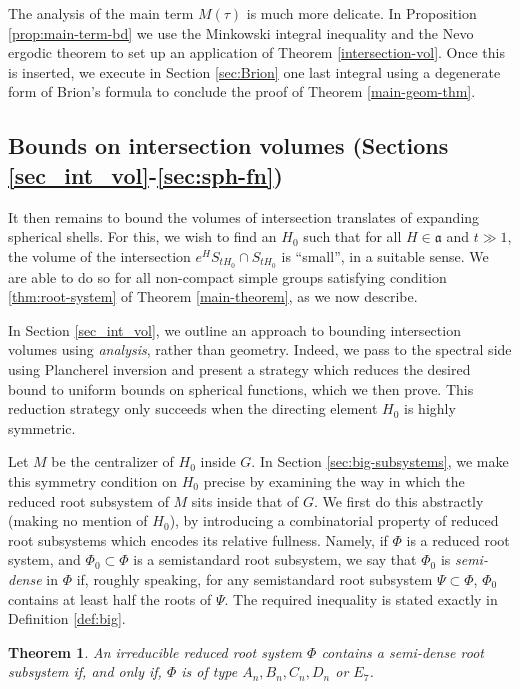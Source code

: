 \documentclass[12pt]{amsart}
\newtheorem{theorem}{Theorem}[section]
\theoremstyle{remark}
\begin{document}
The analysis of the main term $M(\tau)$ is much more delicate. In Proposition \ref{prop:main-term-bd} we use the Minkowski integral inequality and the Nevo ergodic theorem to set up an application of Theorem \ref{intersection-vol}. Once this is inserted, we execute in Section \ref{sec:Brion} one last integral using a degenerate form of Brion's formula to conclude the proof of Theorem \ref{main-geom-thm}.


\subsection{Bounds on intersection volumes (Sections \ref{sec_int_vol}-\ref{sec:sph-fn})} \label{sub_sec_int_vol}

It then remains to bound the volumes of intersection translates of expanding spherical shells. For this, we wish to find an $H_0$ such that for all $H \in \mathfrak{a}$ and $t\gg 1$, the volume of the intersection $e^H S_{tH_0} \cap S_{tH_0}$ is ``small'', in a suitable sense. We are able to do so for all non-compact simple groups satisfying condition \eqref{thm:root-system} of Theorem \ref{main-theorem}, as we now describe.

In Section \ref{sec_int_vol}, we outline an approach to bounding intersection volumes using \textit{analysis}, rather than geometry. Indeed, we pass to the spectral side using Plancherel inversion and present a strategy which reduces the desired bound to uniform bounds on spherical functions, which we then prove. This reduction strategy only succeeds when the directing element $H_0$ is highly symmetric.

Let $M$ be the centralizer of $H_0$ inside $G$. In Section \ref{sec:big-subsystems}, we make this symmetry condition on $H_0$ precise by examining the way in which the reduced root subsystem of $M$ sits inside that of $G$. We first do this abstractly (making no mention of $H_0$), by introducing a combinatorial property of reduced root subsystems which encodes its relative fullness. Namely, if $\Phi$ is a reduced root system, and $\Phi_0\subset\Phi$ is a semistandard root subsystem, we say that $\Phi_0$ is \textit{semi-dense} in $\Phi$ if, roughly speaking, for any semistandard root subsystem $\Psi \subset \Phi$, $\Phi_0$ contains at least half the roots of $\Psi$. The required inequality is stated exactly in Definition \ref{def:big}.

\begin{theorem}\label{thm:semi-dense} An irreducible reduced root system $\Phi$ contains a semi-dense root subsystem if, and only if, $\Phi$ is of type $A_n, B_n, C_n, D_n$ or $E_7$.
\end{theorem}
\end{document}
